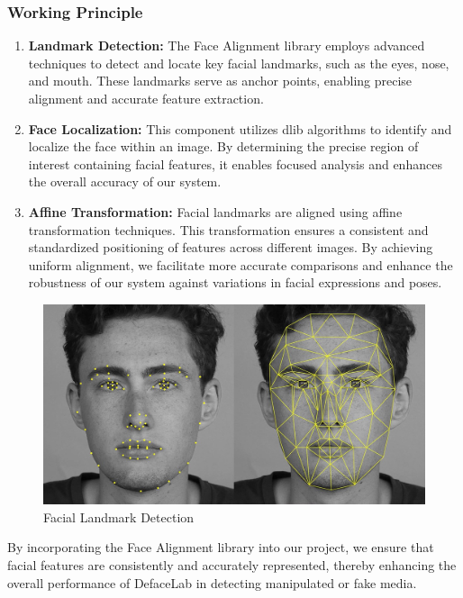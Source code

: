 \subsubsection{Working Principle}

\begin{enumerate}
    \item \textbf{Landmark Detection:} The Face Alignment library employs advanced techniques to detect and locate key facial landmarks, such as the eyes, nose, and mouth. These landmarks serve as anchor points, enabling precise alignment and accurate feature extraction.

    \item \textbf{Face Localization:} This component utilizes dlib algorithms to identify and localize the face within an image. By determining the precise region of interest containing facial features, it enables focused analysis and enhances the overall accuracy of our system.

    \item \textbf{Affine Transformation:} Facial landmarks are aligned using affine transformation techniques. This transformation ensures a consistent and standardized positioning of features across different images. By achieving uniform alignment, we facilitate more accurate comparisons and enhance the robustness of our system against variations in facial expressions and poses.

\end{enumerate}

\begin{figure}[htbp]
    \centering
    \includegraphics[width=5in]{img/facial feature.jpg}
    \caption{Facial Landmark Detection}
\end{figure}

By incorporating the Face Alignment library into our project, we ensure that facial features are consistently and accurately represented, thereby enhancing the overall performance of DefaceLab in detecting manipulated or fake media.\\

